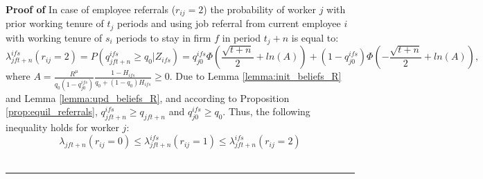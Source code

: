 \documentclass[12pt]{article}
\newenvironment{proof}[1][Proof of]{\noindent\textbf{#1} }{\ \rule{0.5em}{0.5em}}
\begin{document}
\begin{proof}
    In case of employee referrals ($r_{ij} = 2$) the probability of worker $j$ with prior working tenure of $t_j$ periods and using job referral from current employee $i$ with working tenure of $s_i$ periods to stay in firm $f$ in period $t_j+n$ is equal to:
    \begin{equation}
        \lambda_{jft+n}^{ifs}(r_{ij}=2) 
        = 
        P(q_{jft+n}^{ifs}\geq q_0 | Z_{ifs}) 
        = 
        q_{j0}^{ifs}\Phi\left(\frac{\sqrt{t+n}}{2}+ln(A)\right)
        +
        (1-q_{j0}^{ifs})\Phi\left(-\frac{\sqrt{t+n}}{2}+ln(A)\right),
    \end{equation}
    where $A = \frac{R^\mu}{q_0(1-q_{j0}^{ifs})}\frac{1-H_{ifs}}{q_0 + (1-q_0)H_{ifs}}\geq 0$. Due to Lemma \ref{lemma:init_beliefs_R} and Lemma \ref{lemma:upd_beliefs_R}, and according to Proposition \ref{prop:equil_referrals}, $q_{jft+n}^{ifs}\geq q_{jft+n}$ and $q_{j0}^{ifs}\geq q_0$. Thus, the following inequality holds for worker $j$:
    \begin{equation}
        \lambda_{jft+n}(r_{ij}=0) \leq \lambda_{jft+n}^{ifs}(r_{ij}=1) \leq \lambda_{jft+n}^{ifs}(r_{ij}=2)
    \end{equation}
\end{proof}







\end{document}
